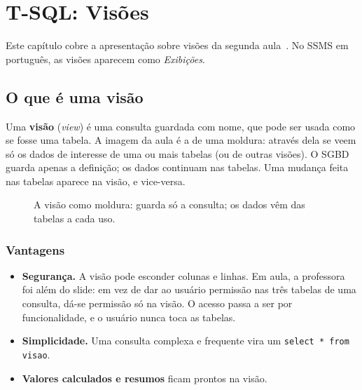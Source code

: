 \setchapterpreamble[u]{\margintoc}
\chapter{T-SQL: Visões}

Este capítulo cobre a apresentação sobre visões da segunda
aula~\cite{BaiocoCET615}. No SSMS em português, as visões aparecem
como \emph{Exibições}.

\section{O que é uma visão}

Uma \textbf{visão} (\emph{view}) é uma consulta guardada
com nome, que pode ser usada como se fosse uma tabela. A imagem da aula
é a de uma moldura: através dela se veem só os dados de interesse de uma
ou mais tabelas (ou de outras visões). O SGBD guarda apenas a definição;
os dados continuam nas tabelas. Uma mudança feita nas tabelas aparece
na visão, e vice-versa.

\begin{figure}[h]
\centering
{}
\caption{A visão como moldura: guarda só a consulta; os dados vêm das
tabelas a cada uso.}
\end{figure}

\subsection{Vantagens}

\begin{itemize}
	\item \textbf{Segurança.} A visão pode esconder colunas e linhas. Em
	aula, a professora foi além do slide: em vez de dar ao usuário
	permissão nas três tabelas de uma consulta, dá-se permissão só na
	visão. O acesso passa a ser por funcionalidade, e o usuário nunca toca
	as tabelas.
	\item \textbf{Simplicidade.} Uma consulta complexa e frequente vira um
	\texttt{select * from visao}.
	\item \textbf{Valores calculados e resumos} ficam prontos na visão.
\end{itemize}

